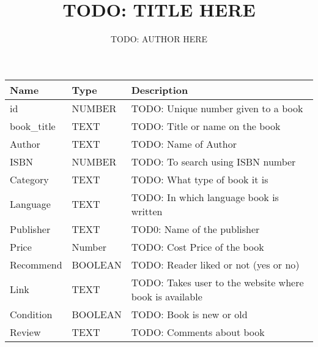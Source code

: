 \documentclass[10pt,a4paper]{article}
\title{TODO: TITLE HERE}
\author{TODO: AUTHOR HERE}
\begin{document}
\maketitle

\begin{tabularx}{\textwidth}{llX}
\toprule
\textbf{Name} & \textbf{Type} & \textbf{Description}\\
\midrule
id & NUMBER & TODO: Unique number given to a book\\
book\_title & TEXT & TODO: Title or name on the book\\
Author & TEXT & TODO: Name of Author\\
ISBN & NUMBER & TODO: To search using ISBN number\\
Category & TEXT & TODO: What type of book it is\\
Language & TEXT & TODO: In which language book is written\\
Publisher & TEXT & TOD0: Name of the publisher\\
Price & Number & TODO: Cost Price of the book\\
Recommend & BOOLEAN & TODO: Reader liked or not (yes or no)\\
Link & TEXT & TODO: Takes user to the website where book is available\\
Condition & BOOLEAN & TODO: Book is new or old\\
Review & TEXT & TODO: Comments about book\\
\bottomrule
\end{tabularx}
\end{document}
